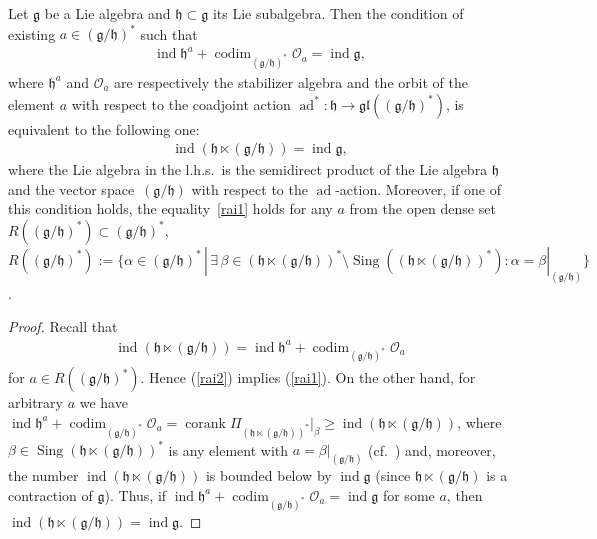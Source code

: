 \begin{Lemma}\label{lrais} Let $\mathfrak{g}$ be a Lie algebra and $\mathfrak{h} \subset\mathfrak{g}$ its Lie subalgebra. Then the condition of existing $a\in (\mathfrak{g}/\mathfrak{h})^*$ such that
\begin{gather}\label{rai1}
 \operatorname{ind} \mathfrak{h}^{a}+ \operatorname{codim}_{(\mathfrak{g}/\mathfrak{h})^*}\mathcal{O}_{a} = \operatorname{ind} \mathfrak{g},
 \end{gather}
where $\mathfrak{h}^{a}$ and $\mathcal{O}_{a}$ are respectively the stabilizer algebra and the orbit of the element $a$ with respect to the coadjoint action $ \operatorname{ad}^*\colon \mathfrak{h} \to \mathfrak{gl} (( {\mathfrak{g}}/{\mathfrak{h} })^*)$, is equivalent to the following one:
 \begin{gather}\label{rai2}
 \operatorname{ind} (\mathfrak{h}\ltimes (\mathfrak{g}/\mathfrak{h}))=\operatorname{ind} \mathfrak{g},
 \end{gather}
 where the Lie algebra in the l.h.s.\ is the semidirect product of the Lie algebra $\mathfrak{h}$ and the vector space~$(\mathfrak{g}/\mathfrak{h})$ with respect to the $\operatorname{ad}$-action.
 Moreover, if one of this condition holds, the equality~\eqref{rai1} holds for any $a$ from the open dense set $R((\mathfrak{g}/\mathfrak{h})^*) \subset (\mathfrak{g}/\mathfrak{h})^*$, $R((\mathfrak{g}/\mathfrak{h})^*):=\{\alpha\in (\mathfrak{g}/\mathfrak{h})^*\,|\, \exists\, \beta\in (\mathfrak{h}\ltimes (\mathfrak{g}/\mathfrak{h}))^*\setminus \operatorname{Sing} ((\mathfrak{h}\ltimes (\mathfrak{g}/\mathfrak{h}))^*)\colon \alpha= \beta|_{(\mathfrak{g}/\mathfrak{h})}\}$.
 \end{Lemma}

\begin{proof} Recall \cite[Proposition~1.3(i)]{rais} that
\begin{gather*}
\operatorname{ind} (\mathfrak{h}\ltimes (\mathfrak{g}/\mathfrak{h}))= \operatorname{ind} \mathfrak{h}^{a}+ \operatorname{codim}_{(\mathfrak{g}/\mathfrak{h})^*}\mathcal{O}_{a}
\end{gather*}
for $a\in R((\mathfrak{g}/\mathfrak{h})^*)$. Hence (\ref{rai2}) implies (\ref{rai1}). On the other hand, for arbitrary $a$ we have $ \operatorname{ind} \mathfrak{h}^{a}+ \operatorname{codim}_{(\mathfrak{g}/\mathfrak{h})^*}\mathcal{O}_{a}=\operatorname{corank} \Pi_{(\mathfrak{h}\ltimes (\mathfrak{g}/\mathfrak{h}))^*}|_\beta\ge \operatorname{ind} (\mathfrak{h}\ltimes (\mathfrak{g}/\mathfrak{h}))$, where $\beta\in \operatorname{Sing} (\mathfrak{h}\ltimes (\mathfrak{g}/\mathfrak{h}))^*$ is any element with $a= \beta|_{(\mathfrak{g}/\mathfrak{h})}$ (cf.~\cite[Theorem~1.1]{pRais}) and, moreover, the number $\operatorname{ind} (\mathfrak{h}\ltimes (\mathfrak{g}/\mathfrak{h}))$ is bounded below by $\operatorname{ind} \mathfrak{g}$ (since $\mathfrak{h}\ltimes (\mathfrak{g}/\mathfrak{h})$ is a contraction of $\mathfrak{g}$). Thus, if $\operatorname{ind} \mathfrak{h}^{a}+ \operatorname{codim}_{(\mathfrak{g}/\mathfrak{h})^*}\mathcal{O}_{a}=\operatorname{ind} \mathfrak{g}$ for some $a$, then $\operatorname{ind} (\mathfrak{h}\ltimes (\mathfrak{g}/\mathfrak{h}))= \operatorname{ind} \mathfrak{g}$.
\end{proof}

